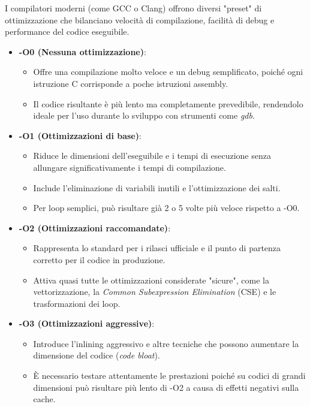 I compilatori moderni (come GCC o Clang) offrono diversi "preset" di ottimizzazione che bilanciano velocità di compilazione, facilità di debug e performance del codice eseguibile.

\begin{itemize}
    \item \textbf{-O0 (Nessuna ottimizzazione)}:
        \begin{itemize}
        \item Offre una compilazione molto veloce e un debug semplificato, poiché ogni istruzione C corrisponde a poche istruzioni assembly.
        \item Il codice risultante è più lento ma completamente prevedibile, rendendolo ideale per l'uso durante lo sviluppo con strumenti come \textit{gdb}.
    \end{itemize}

    \item \textbf{-O1 (Ottimizzazioni di base)}:
    \begin{itemize}
        \item Riduce le dimensioni dell'eseguibile e i tempi di esecuzione senza allungare significativamente i tempi di compilazione.
        \item Include l'eliminazione di variabili inutili e l'ottimizzazione dei salti.
        \item Per loop semplici, può risultare già 2 o 5 volte più veloce rispetto a -O0.
    \end{itemize}

    \item \textbf{-O2 (Ottimizzazioni raccomandate)}:
    \begin{itemize}
        \item Rappresenta lo standard per i rilasci ufficiale e il punto di partenza corretto per il codice in produzione.
        \item Attiva quasi tutte le ottimizzazioni considerate "sicure", come la vettorizzazione, la \textit{Common Subexpression Elimination} (CSE) e le trasformazioni dei loop.
    \end{itemize}

    \item \textbf{-O3 (Ottimizzazioni aggressive)}:
    \begin{itemize}
        \item Introduce l'inlining aggressivo e altre tecniche che possono aumentare la dimensione del codice (\textit{code bloat}).
        \item È necessario testare attentamente le prestazioni poiché su codici di grandi dimensioni può risultare più lento di -O2 a causa di effetti negativi sulla cache.
    \end{itemize}


\end{itemize}
